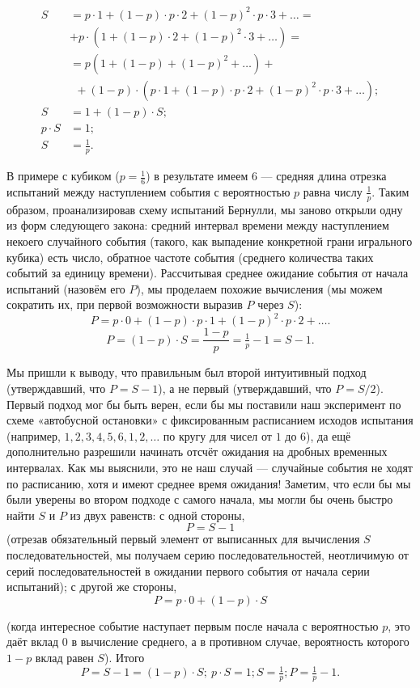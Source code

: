 \documentclass{article}
\begin{document}
\begin{align*}
S&=p\cdot 1+(1-p)\cdot p\cdot 2+(1-p)^2\cdot p\cdot 3+\dots=
\\
&+p\cdot(1+(1-p)\cdot 2+(1-p)^2\cdot 3+\dots)=
\\
&=p(1+(1-p)+(1-p)^2+\dots)+
\\
&\ \ +(1-p)\cdot(p\cdot 1+(1-p)\cdot p\cdot 2+(1-p)^2\cdot p\cdot 3+\dots);
\\
S&=1+(1-p)\cdot S;
\\
p\cdot S&=1;
\\
S&=\tfrac1p.
\end{align*}



В примере с кубиком ($p=\tfrac16$) 
в результате имеем $6$ --- средняя длина отрезка испытаний между наступлением события с вероятностью $p$ равна числу $\tfrac1p$.
Таким образом, проанализировав схему испытаний Бернулли, мы заново открыли одну из форм следующего закона: средний интервал времени между наступлением некоего случайного события (такого, как выпадение конкретной грани игрального кубика) есть число, обратное частоте события (среднего количества таких событий за единицу времени). 
Рассчитывая среднее ожидание события от начала испытаний (назовём его $P$), 
мы проделаем похожие вычисления (мы можем сократить их, при первой возможности выразив $P$ через $S$):
\[P=p\cdot 0+(1-p)\cdot p\cdot 1+(1-p)^2\cdot p\cdot 2+\dots.\]
\[P=(1-p)\cdot S=\frac{1-p}{p}=\tfrac1p-1=S-1.\]

Мы пришли к выводу, что правильным был второй интуитивный подход (утверждавший, что $P=S-1$), 
а не первый (утверждавший, что $P=S/2$). 
Первый подход мог бы быть верен, 
если бы мы поставили наш эксперимент по схеме «автобусной остановки» 
с фиксированным расписанием исходов испытания 
(например, $1,2,3,4,5,6,1,2,\dots$ по кругу для чисел от $1$ до $6$), 
да ещё дополнительно разрешили начинать отсчёт ожидания на дробных временных интервалах. Как мы выяснили, это не наш случай --- случайные события не ходят по расписанию, хотя и имеют среднее время ожидания! Заметим, что если бы мы были уверены во втором подходе с самого начала, мы могли бы очень быстро найти $S$ и $P$ из двух равенств: с одной стороны,
\[P=S-1\]
(отрезав обязательный первый элемент от выписанных для вычисления $S$ последовательностей, мы получаем серию последовательностей, неотличимую от серий последовательностей в ожидании первого события от начала серии испытаний); с другой же стороны,
\[P=p\cdot0+(1-p)\cdot S\]

(когда интересное событие наступает первым после начала с вероятностью $p$, 
это даёт вклад $0$ в вычисление среднего, 
а в противном случае, вероятность которого $1-p$ вклад равен $S$). 
Итого
\[P=S-1=(1-p)\cdot S; \ p\cdot S=1; S=\tfrac1p; P=\tfrac1p-1.\]
\end{document}
